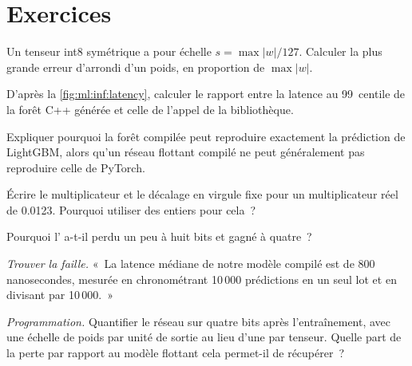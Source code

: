 \section{Exercices}

\begin{exercise}[$\star$]\label{exo:ml:low-latency-inference:1}
Un tenseur int8 symétrique a pour échelle $s = \max|w|/127$. Calculer la plus grande erreur d'arrondi d'un poids, en proportion de $\max|w|$.
\end{exercise}

\begin{exercise}[$\star$]\label{exo:ml:low-latency-inference:2}
D'après la \cref{fig:ml:inf:latency}, calculer le rapport entre la latence au 99~centile de la forêt C++ générée et celle de l'appel de la bibliothèque.
\end{exercise}

\begin{exercise}[$\star$]\label{exo:ml:low-latency-inference:3}
Expliquer pourquoi la forêt compilée peut reproduire exactement la prédiction de LightGBM, alors qu'un réseau flottant compilé ne peut
généralement pas reproduire celle de PyTorch.
\end{exercise}

\begin{exercise}[$\star\star$]\label{exo:ml:low-latency-inference:4}
Écrire le multiplicateur et le décalage en virgule fixe pour un multiplicateur réel de 0.0123. Pourquoi utiliser des entiers pour cela~?
\end{exercise}

\begin{exercise}[$\star\star$]\label{exo:ml:low-latency-inference:5}
Pourquoi l' a-t-il perdu un peu à huit bits et gagné à quatre~?
\end{exercise}

\begin{exercise}[$\star\star$]\label{exo:ml:low-latency-inference:6}
\emph{Trouver la faille.} «~La latence médiane de notre modèle compilé est de 800 nanosecondes, mesurée en chronométrant 10\,000 prédictions en un seul
lot et en divisant par 10\,000.~»
\end{exercise}

\begin{exercise}[$\star\star\star$]\label{exo:ml:low-latency-inference:7}
\emph{Programmation.} Quantifier le réseau sur quatre bits après l'entraînement, avec une échelle de poids par unité de sortie au lieu d'une par
tenseur. Quelle part de la perte par rapport au modèle flottant cela permet-il de récupérer~?
\end{exercise}

